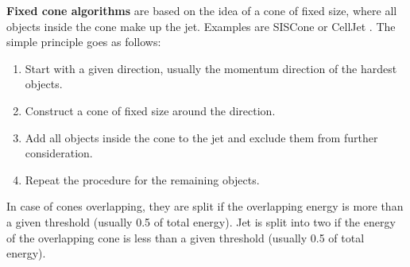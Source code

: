 \textbf{Fixed cone algorithms} are based on the idea of a cone of fixed size, where all objects inside the cone make up the jet.
Examples are SISCone \cite{siscone} or CellJet \cite{pythia}.
The simple principle goes as follows:
\begin{enumerate}
    \item Start with a given direction, usually the momentum direction of the hardest objects.
    \item Construct a cone of fixed size around the direction.
    \item Add all objects inside the cone to the jet and exclude them from further consideration.
    \item Repeat the procedure for the remaining objects.
\end{enumerate}
In case of cones overlapping, they are split if the overlapping energy is more than a given threshold (usually 0.5 of total energy).
Jet is split into two if the energy of the overlapping cone is less than a given threshold (usually 0.5 of total energy).

